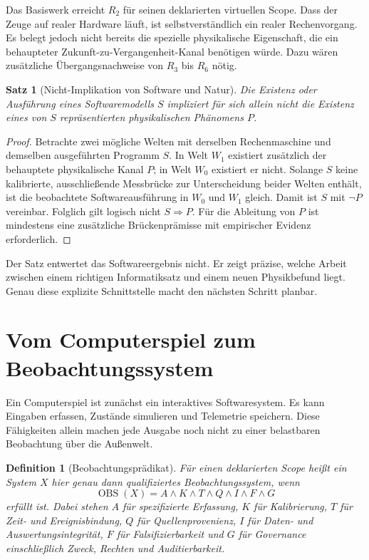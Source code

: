 \documentclass[11pt,a4paper]{article}
\newtheorem{definition}{Definition}[section]
\newtheorem{satz}{Satz}[section]
\theoremstyle{remark}
\begin{document}
Das Basiswerk erreicht $R_2$ für seinen deklarierten virtuellen Scope. Dass
der Zeuge auf realer Hardware läuft, ist selbstverständlich ein realer
Rechenvorgang. Es belegt jedoch nicht bereits die spezielle physikalische
Eigenschaft, die ein behaupteter Zukunft-zu-Vergangenheit-Kanal benötigen
würde. Dazu wären zusätzliche Übergangsnachweise von $R_3$ bis $R_6$ nötig.

\begin{satz}[Nicht-Implikation von Software und Natur]
Die Existenz oder Ausführung eines Softwaremodells $S$ impliziert für sich
allein nicht die Existenz eines von $S$ repräsentierten physikalischen
Phänomens $P$.
\end{satz}

\begin{proof}
Betrachte zwei mögliche Welten mit derselben Rechenmaschine und demselben
ausgeführten Programm $S$. In Welt $W_1$ existiert zusätzlich der behauptete
physikalische Kanal $P$; in Welt $W_0$ existiert er nicht. Solange $S$ keine
kalibrierte, ausschließende Messbrücke zur Unterscheidung beider Welten
enthält, ist die beobachtete Softwareausführung in $W_0$ und $W_1$ gleich.
Damit ist $S$ mit $\neg P$ vereinbar. Folglich gilt logisch nicht
$S\Rightarrow P$. Für die Ableitung von $P$ ist mindestens eine zusätzliche
Brückenprämisse mit empirischer Evidenz erforderlich.
\end{proof}

Der Satz entwertet das Softwareergebnis nicht. Er zeigt präzise, welche
Arbeit zwischen einem richtigen Informatiksatz und einem neuen Physikbefund
liegt. Genau diese explizite Schnittstelle macht den nächsten Schritt
planbar.

\section{Vom Computerspiel zum Beobachtungssystem}
\label{sec:obs}

Ein Computerspiel ist zunächst ein interaktives Softwaresystem. Es kann
Eingaben erfassen, Zustände simulieren und Telemetrie speichern. Diese
Fähigkeiten allein machen jede Ausgabe noch nicht zu einer belastbaren
Beobachtung über die Außenwelt.

\begin{definition}[Beobachtungsprädikat]
Für einen deklarierten Scope heißt ein System $X$ hier genau dann
\emph{qualifiziertes Beobachtungssystem}, wenn
\[
\operatorname{OBS}(X)=A\land K\land T\land Q\land I\land F\land G
\]
erfüllt ist. Dabei stehen $A$ für spezifizierte Erfassung, $K$ für
Kalibrierung, $T$ für Zeit- und Ereignisbindung, $Q$ für Quellenprovenienz,
$I$ für Daten- und Auswertungsintegrität, $F$ für Falsifizierbarkeit und
$G$ für Governance einschließlich Zweck, Rechten und Auditierbarkeit.
\end{definition}
\end{document}
